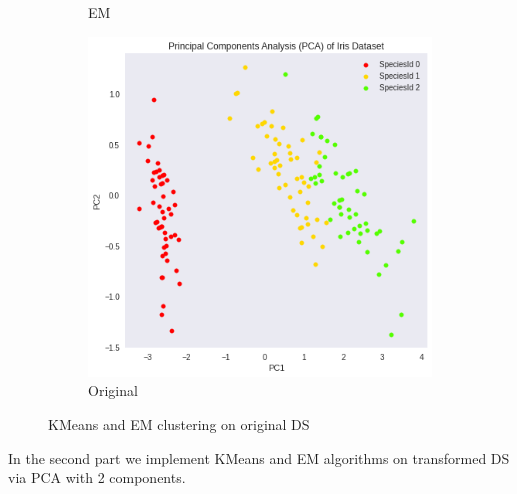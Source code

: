 \documentclass{homework}
\begin{document}
\begin{figure}[hbt!]
\begin{subfigure}[b]{0.3\textwidth}
         \caption{EM}
     \end{subfigure}
     \hfill
     \begin{subfigure}[b]{0.3\textwidth}
         \centering
         \includegraphics[width=\textwidth]{original_DS.png}
         \caption{Original}
     \end{subfigure}
        \caption{KMeans and EM clustering on original DS}
\end{figure}

In the second part we implement KMeans and EM algorithms on transformed DS via PCA with 2 components.
\end{document}

